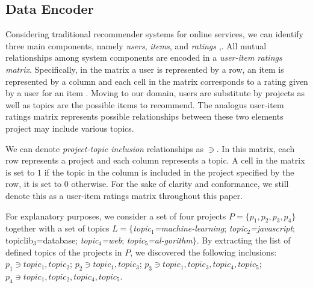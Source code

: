 \subsection{Data Encoder} \label{sec:DataEncoder}

Considering traditional recommender systems for online services, we can identify three main components, namely \emph{users}, \emph{items}, and
\emph{ratings} \cite{Sarwar:2001:ICF:371920.372071},\cite{DBLP:conf/rweb/NoiaO15}. All mutual relationships among system components are encoded in a \emph{user-item ratings matrix}. Specifically, in the matrix a user is represented by a row,
an item is represented by a column and each cell in the matrix corresponds to a rating given by a user for an item
\cite{DBLP:conf/rweb/NoiaO15}. Moving to our domain, users are substitute by projects as well as topics are the possible items to recommend. The analogus user-item ratings matrix represents possible relationships between these two elements \ie project may include various topics. 

We can denote \emph{project-topic inclusion} relationships as $\ni$. In this matrix, each row represents a project and each column represents a topic. A cell in the matrix is set to $1$ if the topic in the column is included in the project specified by the row, it is set to $0$
otherwise. For the sake of clarity and conformance, we still denote this as a user-item ratings matrix throughout this
paper.

For explanatory purposes, we consider a set of four projects $P=\{p_1,p_2,p_3,p_4 \}$ together with a set of topics $L=\{$\emph{topic$_1$=machine-learning}; \emph{topic$_2$=javascript}; topic{lib$_3$=database}; \emph{topic$_4$=web}; \emph{topic$_5$=al-gorithm}$\}$. By extracting the list of defined topics of the projects in $P$, we discovered the following inclusions: $p_1 \ni topic_1,topic_2$; $p_2 \ni topic_1,topic_3$; $p_3 \ni topic_1 ,topic_3, topic_4, topic_5$;\\
$p_4 \ni topic_1,topic_2,topic_4,topic_5$.



